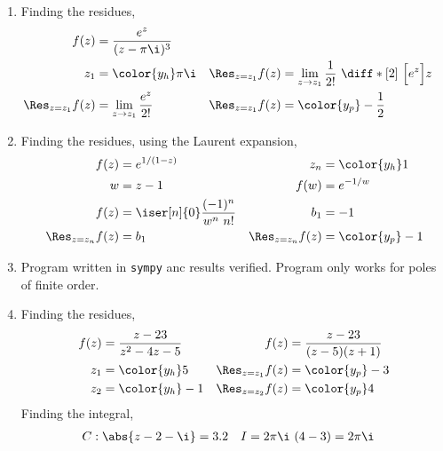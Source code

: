 \begin{enumerate}
    \item Finding the residues,
          \begin{align}
              f(z)                & = \frac{e^z}{(z - \pi\i)^3}                  \\
              z_1                 & = \color{y_h} \pi\i                        &
              \Res_{z = z_1} f(z) & = \lim_{z \to z_1} \frac{1}{2!}\ \diff*[2]
              {\ \Big[ e^z \Big]}{z}                                             \\
              \Res_{z = z_1} f(z) & = \lim_{z \to z_1} \frac{e^z}{2!}          &
              \Res_{z = z_1} f(z) & = \color{y_p} -\frac{1}{2}
          \end{align}

    \item Finding the residues, using the Laurent expansion,
          \begin{align}
              f(z)                & = e^{1/(1-z)}                        &
              z_n                 & = \color{y_h} 1                        \\
              w                   & = z-1                                &
              f(w)                & = e^{-1/w}                             \\
              f(z)                & = \iser[n]{0} \frac{(-1)^n}{w^n\ n!} &
              b_1                 & = -1                                   \\
              \Res_{z = z_n} f(z) & = b_1                                &
              \Res_{z = z_n} f(z) & = \color{y_p} -1
          \end{align}

    \item Program written in \texttt{sympy} anc results verified. Program only
          works for poles of finite order.

    \item Finding the residues,
          \begin{align}
              f(z)                & = \frac{z - 23}{z^2 - 4z - 5}   &
              f(z)                & = \frac{z - 23}{(z - 5)(z + 1)}   \\
              z_1                 & = \color{y_h} 5                 &
              \Res_{z = z_1} f(z) & = \color{y_p} -3                  \\
              z_2                 & = \color{y_h} -1                &
              \Res_{z = z_2} f(z) & = \color{y_p} 4
          \end{align}
          Finding the integral,
          \begin{align}
              C & : \abs{z - 2 - \i} = 3.2   &
              I & = 2\pi\i\ (4 - 3) = 2\pi\i
          \end{align}


\end{enumerate}
